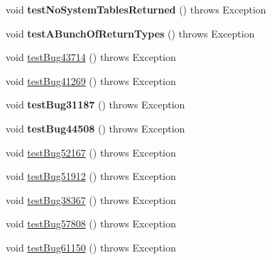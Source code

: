\begin{DoxyCompactItemize}
\mbox{\label{classtestsuite_1_1regression_1_1_meta_data_regression_test_a25affb2779e50388dbed36b52de4f1ea}} 
void {\bfseries test\+No\+System\+Tables\+Returned} ()  throws Exception 
\item 
\mbox{\label{classtestsuite_1_1regression_1_1_meta_data_regression_test_a502252e326916cd0924cd5304e805840}} 
void {\bfseries test\+A\+Bunch\+Of\+Return\+Types} ()  throws Exception 
\item 
void \mbox{\hyperlink{classtestsuite_1_1regression_1_1_meta_data_regression_test_ab951e6884bbb864b56804cdbb096b57d}{test\+Bug43714}} ()  throws Exception 
\item 
void \mbox{\hyperlink{classtestsuite_1_1regression_1_1_meta_data_regression_test_a797ade6bff170eaf2551f5731a3dd7ef}{test\+Bug41269}} ()  throws Exception 
\item 
\mbox{\label{classtestsuite_1_1regression_1_1_meta_data_regression_test_ae11afffc667500d79aec8b585ccd51a5}} 
void {\bfseries test\+Bug31187} ()  throws Exception 
\item 
\mbox{\label{classtestsuite_1_1regression_1_1_meta_data_regression_test_ad93bb1dae18b4d8f194c7ba8a4d6b09d}} 
void {\bfseries test\+Bug44508} ()  throws Exception 
\item 
void \mbox{\hyperlink{classtestsuite_1_1regression_1_1_meta_data_regression_test_a9fe48a9548719aa95df0a85252333e6c}{test\+Bug52167}} ()  throws Exception 
\item 
void \mbox{\hyperlink{classtestsuite_1_1regression_1_1_meta_data_regression_test_a38cf409b423124090866e96e64226104}{test\+Bug51912}} ()  throws Exception 
\item 
void \mbox{\hyperlink{classtestsuite_1_1regression_1_1_meta_data_regression_test_a8ef9287c41ad42ae8faf6e7bb34a6fcb}{test\+Bug38367}} ()  throws Exception 
\item 
void \mbox{\hyperlink{classtestsuite_1_1regression_1_1_meta_data_regression_test_ade987f06121aa11b35ee8860ae893a51}{test\+Bug57808}} ()  throws Exception 
\item 
void \mbox{\hyperlink{classtestsuite_1_1regression_1_1_meta_data_regression_test_ab171769c1d241e02730a4b626b9bd150}{test\+Bug61150}} ()  throws Exception 

\end{DoxyCompactItemize}
